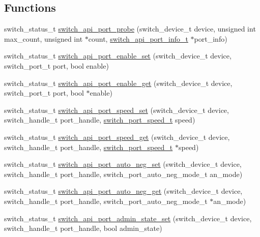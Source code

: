 \subsection*{Functions}
\begin{DoxyCompactItemize}
\item 
switch\+\_\+status\+\_\+t \hyperlink{group__Port_ga7a09ba95beac49bc763d563fe8c98a25}{switch\+\_\+api\+\_\+port\+\_\+probe} (switch\+\_\+device\+\_\+t device, unsigned int max\+\_\+count, unsigned int $\ast$count, \hyperlink{structswitch__api__port__info__s}{switch\+\_\+api\+\_\+port\+\_\+info\+\_\+t} $\ast$port\+\_\+info)
\item 
switch\+\_\+status\+\_\+t \hyperlink{group__Port_ga8ccf05054438433dd23425f30d7af728}{switch\+\_\+api\+\_\+port\+\_\+enable\+\_\+set} (switch\+\_\+device\+\_\+t device, switch\+\_\+port\+\_\+t port, bool enable)
\item 
switch\+\_\+status\+\_\+t \hyperlink{group__Port_gab3cc4a1b27d8e28b64738a68d4e1b3dd}{switch\+\_\+api\+\_\+port\+\_\+enable\+\_\+get} (switch\+\_\+device\+\_\+t device, switch\+\_\+port\+\_\+t port, bool $\ast$enable)
\item 
switch\+\_\+status\+\_\+t \hyperlink{group__Port_ga721fff732966b9706403fb8f07dca1af}{switch\+\_\+api\+\_\+port\+\_\+speed\+\_\+set} (switch\+\_\+device\+\_\+t device, switch\+\_\+handle\+\_\+t port\+\_\+handle, \hyperlink{group__Port_ga29ae043889998625e4f817091229005c}{switch\+\_\+port\+\_\+speed\+\_\+t} speed)
\item 
switch\+\_\+status\+\_\+t \hyperlink{group__Port_ga2bdeb19717ce9325f184b001a20ed84a}{switch\+\_\+api\+\_\+port\+\_\+speed\+\_\+get} (switch\+\_\+device\+\_\+t device, switch\+\_\+handle\+\_\+t port\+\_\+handle, \hyperlink{group__Port_ga29ae043889998625e4f817091229005c}{switch\+\_\+port\+\_\+speed\+\_\+t} $\ast$speed)
\item 
switch\+\_\+status\+\_\+t \hyperlink{group__Port_ga2f088c5660801030ce019958214c3c51}{switch\+\_\+api\+\_\+port\+\_\+auto\+\_\+neg\+\_\+set} (switch\+\_\+device\+\_\+t device, switch\+\_\+handle\+\_\+t port\+\_\+handle, switch\+\_\+port\+\_\+auto\+\_\+neg\+\_\+mode\+\_\+t an\+\_\+mode)
\item 
switch\+\_\+status\+\_\+t \hyperlink{group__Port_ga31cdf6eab8a5f037449ada5ea7e688c1}{switch\+\_\+api\+\_\+port\+\_\+auto\+\_\+neg\+\_\+get} (switch\+\_\+device\+\_\+t device, switch\+\_\+handle\+\_\+t port\+\_\+handle, switch\+\_\+port\+\_\+auto\+\_\+neg\+\_\+mode\+\_\+t $\ast$an\+\_\+mode)
\item 
switch\+\_\+status\+\_\+t \hyperlink{group__Port_gad94f9eacbf5a73aae21faba1beeec0d7}{switch\+\_\+api\+\_\+port\+\_\+admin\+\_\+state\+\_\+set} (switch\+\_\+device\+\_\+t device, switch\+\_\+handle\+\_\+t port\+\_\+handle, bool admin\+\_\+state)

\end{DoxyCompactItemize}
